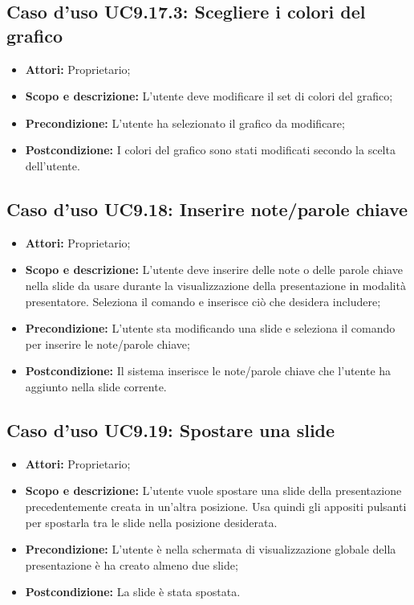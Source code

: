 		\subsection{Caso d'uso UC9.17.3: Scegliere i colori del grafico}
		\begin{itemize}
			\item \textbf{Attori:} Proprietario;
			\item \textbf{Scopo e descrizione:} L'utente deve modificare il set di colori del grafico;
			\item \textbf{Precondizione:} L'utente ha selezionato il grafico da modificare;
			\item \textbf{Postcondizione:} I colori del grafico sono stati modificati secondo la scelta dell'utente.
		\end{itemize}


\subsection{Caso d'uso UC9.18: Inserire note/parole chiave}
\begin{itemize}
	\item \textbf{Attori:} Proprietario;
	\item \textbf{Scopo e descrizione:} L'utente deve inserire delle note o delle parole chiave nella \gls{slide} da usare durante la visualizzazione della presentazione in modalità presentatore. Seleziona il comando e inserisce ciò che desidera includere;
	\item \textbf{Precondizione:} L'utente sta modificando una \gls{slide} e seleziona il comando per inserire le note/parole chiave;
	\item \textbf{Postcondizione:} Il sistema inserisce le note/parole chiave che l'utente ha aggiunto nella \gls{slide} corrente.
\end{itemize}

\subsection{Caso d'uso UC9.19: Spostare una \gls{slide}}
\begin{itemize}
	\item \textbf{Attori:} Proprietario;
	\item \textbf{Scopo e descrizione:} L'utente vuole spostare una \gls{slide} della presentazione precedentemente creata in un'altra posizione. Usa quindi gli appositi pulsanti per spostarla tra le slide nella posizione desiderata.
	\item \textbf{Precondizione:} L'utente è nella schermata di visualizzazione globale della presentazione è ha creato almeno due slide;
	\item \textbf{Postcondizione:} La slide è stata spostata.
\end{itemize}
